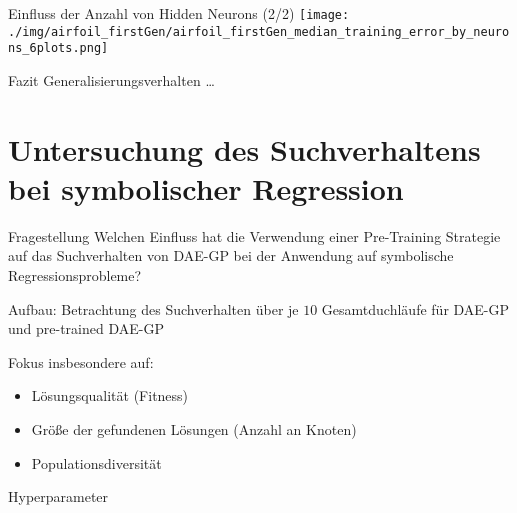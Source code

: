 \documentclass[
  ignorenonframetext,
]{beamer}
\providecommand{\tightlist}{%
  \setlength{\itemsep}{0pt}\setlength{\parskip}{0pt}}
\begin{document}
\begin{frame}{Einfluss der Anzahl von Hidden Neurons (2/2)}
\protect\hypertarget{einfluss-der-anzahl-von-hidden-neurons-22}{}
\texttt{[image: ./img/airfoil\_firstGen/airfoil\_firstGen\_median\_training\_error\_by\_neurons\_6plots.png]}
\end{frame}

\begin{frame}{Fazit Generalisierungsverhalten}
\protect\hypertarget{fazit-generalisierungsverhalten}{}
\ldots{}
\end{frame}

\hypertarget{untersuchung-des-suchverhaltens-bei-symbolischer-regression}{%
\section{Untersuchung des Suchverhaltens bei symbolischer
Regression}\label{untersuchung-des-suchverhaltens-bei-symbolischer-regression}}

\begin{frame}{Fragestellung}
\protect\hypertarget{fragestellung-1}{}
Welchen Einfluss hat die Verwendung einer Pre-Training Strategie auf das
Suchverhalten von DAE-GP bei der Anwendung auf symbolische
Regressionsprobleme?

Aufbau: Betrachtung des Suchverhalten über je \(10\) Gesamtduchläufe für
DAE-GP und pre-trained DAE-GP

Fokus insbesondere auf:

\begin{itemize}
\tightlist
\item
  Lösungsqualität (Fitness)
\item
  Größe der gefundenen Lösungen (Anzahl an Knoten)
\item
  Populationsdiversität
\end{itemize}
\end{frame}

\begin{frame}{Hyperparameter}
\protect\hypertarget{hyperparameter}{}
\begin{table}
\centering\begingroup\fontsize{7}{9}\selectfont

\endgroup{}
\end{table}
\end{frame}
\end{document}
